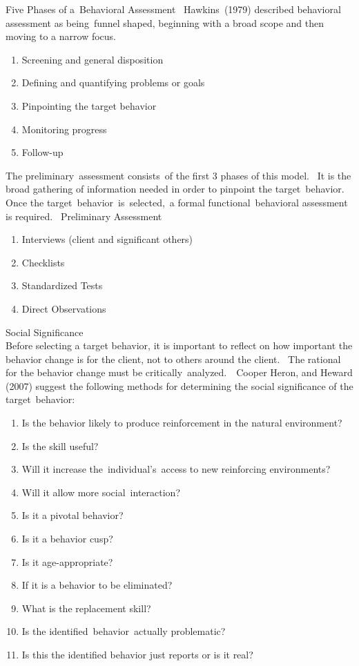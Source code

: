 Five Phases of a Behavioral Assessment 
Hawkins (1979) described behavioral assessment as being funnel shaped, beginning with a broad scope and then moving to a narrow focus.  
\begin{enumerate}
\item Screening and general disposition
\item Defining and quantifying problems or goals
\item  Pinpointing the target behavior
\item Monitoring progress
\item Follow-up
\end{enumerate}

The preliminary assessment consists of the first 3 phases of this model.  It is the broad gathering of information needed in order to pinpoint the target behavior. Once the target behavior is selected, a formal functional behavioral assessment is required. 
% 
Preliminary Assessment\\
\begin{enumerate}
\item Interviews (client and significant others) 
\item Checklists  
\item Standardized Tests 
\item Direct Observations  
\end{enumerate}

Social Significance\\
Before selecting a target behavior, it is important to reflect on how important the behavior change is for the client, not to others around the client.  The rational for the behavior change must be critically analyzed.  Cooper Heron, and Heward (2007) suggest the following methods for determining the social significance of the target behavior: 
\begin{enumerate}
\item Is the behavior likely to produce reinforcement in the natural environment?
\item Is the skill useful?
\item Will it increase the individual's access to new reinforcing environments?
\item Will it allow more social interaction? 
\item Is it a pivotal behavior?  
\item Is it a behavior cusp?
\item Is it age-appropriate? 
\item If it is a behavior to be eliminated?
\item What is the replacement skill? 
\item Is the identified behavior actually problematic? 
\item Is this the identified behavior just reports or is it real? 
\end{enumerate}

